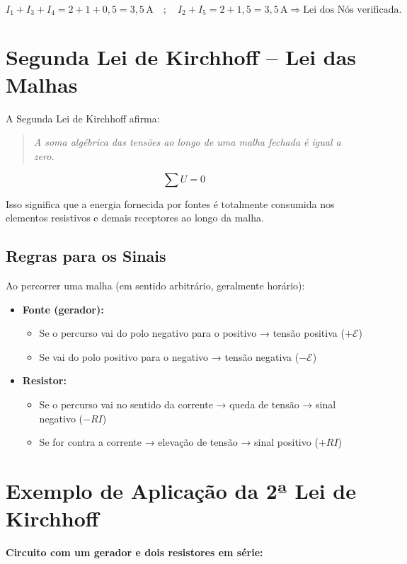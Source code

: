 \[
I_1 + I_3 + I_4 = 2 + 1 + 0{,}5 = 3{,}5\,\text{A}
\quad ; \quad
I_2 + I_5 = 2 + 1{,}5 = 3{,}5\,\text{A}
\Rightarrow \text{Lei dos Nós verificada.}
\]

\section{Segunda Lei de Kirchhoff – Lei das Malhas}
A Segunda Lei de Kirchhoff afirma:

\begin{quote}
\textit{A soma algébrica das tensões ao longo de uma malha fechada é igual a zero.}
\end{quote}

\[
\sum U = 0
\]

Isso significa que a energia fornecida por fontes é totalmente consumida nos elementos resistivos e demais receptores ao longo da malha.

\subsection{Regras para os Sinais}
Ao percorrer uma malha (em sentido arbitrário, geralmente horário):

\begin{itemize}
    \item \textbf{Fonte (gerador):}
    \begin{itemize}
        \item Se o percurso vai do polo negativo para o positivo → tensão positiva ($+\mathcal{E}$)
        \item Se vai do polo positivo para o negativo → tensão negativa ($-\mathcal{E}$)
    \end{itemize}

    \item \textbf{Resistor:}
    \begin{itemize}
        \item Se o percurso vai no sentido da corrente → queda de tensão → sinal negativo ($-RI$)
        \item Se for contra a corrente → elevação de tensão → sinal positivo ($+RI$)
    \end{itemize}
\end{itemize}

\section{Exemplo de Aplicação da 2ª Lei de Kirchhoff}
\textbf{Circuito com um gerador e dois resistores em série:}

